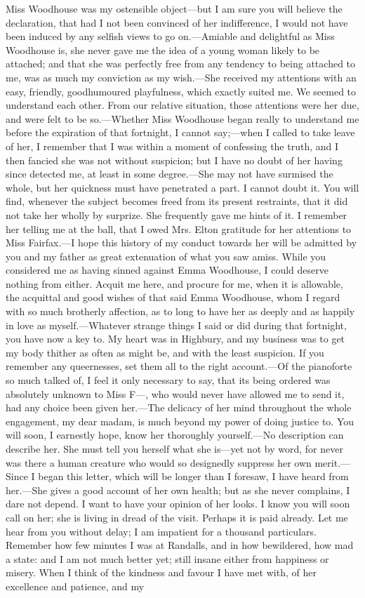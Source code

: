Miss Woodhouse was my ostensible object---but I am sure you will believe the declaration, that had I not been convinced of her indifference, I would not have been induced by any selfish views to go on.---Amiable and delightful as Miss Woodhouse is, she never gave me the idea of a young woman likely to be attached; and that she was perfectly free from any tendency to being attached to me, was as much my conviction as my wish.---She received my attentions with an easy, friendly, goodhumoured playfulness, which exactly suited me. We seemed to understand each other. From our relative situation, those attentions were her due, and were felt to be so.---Whether Miss Woodhouse began really to understand me before the expiration of that fortnight, I cannot say;---when I called to take leave of her, I remember that I was within a moment of confessing the truth, and I then fancied she was not without suspicion; but I have no doubt of her having since detected me, at least in some degree.---She may not have surmised the whole, but her quickness must have penetrated a part. I cannot doubt it. You will find, whenever the subject becomes freed from its present restraints, that it did not take her wholly by surprize. She frequently gave me hints of it. I remember her telling me at the ball, that I owed Mrs. Elton gratitude for her attentions to Miss Fairfax.---I hope this history of my conduct towards her will be admitted by you and my father as great extenuation of what you saw amiss. While you considered me as having sinned against Emma Woodhouse, I could deserve nothing from either. Acquit me here, and procure for me, when it is allowable, the acquittal and good wishes of that said Emma Woodhouse, whom I regard with so much brotherly affection, as to long to have her as deeply and as happily in love as myself.---Whatever strange things I said or did during that fortnight, you have now a key to. My heart was in Highbury, and my business was to get my body thither as often as might be, and with the least suspicion. If you remember any queernesses, set them all to the right account.---Of the pianoforte so much talked of, I feel it only necessary to say, that its being ordered was absolutely unknown to Miss F---, who would never have allowed me to send it, had any choice been given her.---The delicacy of her mind throughout the whole engagement, my dear madam, is much beyond my power of doing justice to. You will soon, I earnestly hope, know her thoroughly yourself.---No description can describe her. She must tell you herself what she is---yet not by word, for never was there a human creature who would so designedly suppress her own merit.---Since I began this letter, which will be longer than I foresaw, I have heard from her.---She gives a good account of her own health; but as she never complains, I dare not depend. I want to have your opinion of her looks. I know you will soon call on her; she is living in dread of the visit. Perhaps it is paid already. Let me hear from you without delay; I am impatient for a thousand particulars. Remember how few minutes I was at Randalls, and in how bewildered, how mad a state: and I am not much better yet; still insane either from happiness or misery. When I think of the kindness and favour I have met with, of her excellence and patience, and my 